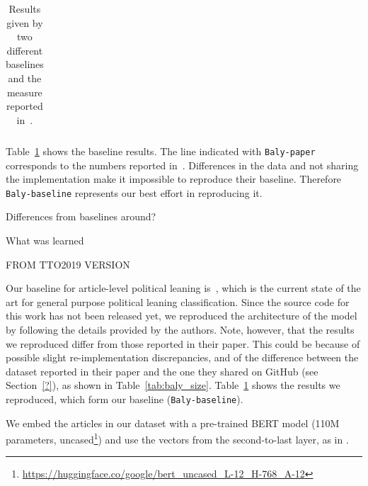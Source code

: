 \begin{table}[!htbp]
\begin{tabular}{l|rr|rr}
    \end{tabular}
    \caption{Results given by two different baselines and the measure reported in~\citet{baly2020we}.
    }
    \label{tab:results_baselines_classifier}
\end{table}

Table~\ref{tab:results_baselines_classifier} shows the baseline results.
The line indicated with \texttt{Baly-paper} corresponds to the numbers reported in~\citet{baly2020we}.
Differences in the data and not sharing the implementation make it impossible to reproduce their baseline.
Therefore \texttt{Baly-baseline} represents our best effort in reproducing it.


Differences from baselines around?

What was learned



FROM TTO2019 VERSION

Our baseline for article-level political leaning is~\citet{baly2020we}, which is the current state of the art for general purpose political leaning classification.
Since the source code for this work has not been released yet, we reproduced the architecture of the model by following the details provided by the authors. %
Note, however, that the results we reproduced differ from those reported in their paper. This could be because of possible slight re-implementation discrepancies, and of the difference between the dataset reported in their paper and the one they shared on GitHub (see Section~\ref{?}), as shown in Table~\ref{tab:baly_size}.%
Table~\ref{tab:results_baselines_classifier} shows the results we reproduced, which form our baseline (\texttt{Baly-baseline}). %




We embed the articles in our dataset with a pre-trained BERT model (110M parameters, uncased\footnote{\url{https://huggingface.co/google/bert_uncased_L-12_H-768_A-12}}) and use the vectors from the second-to-last layer, as in \citet{baly2020we}. %

